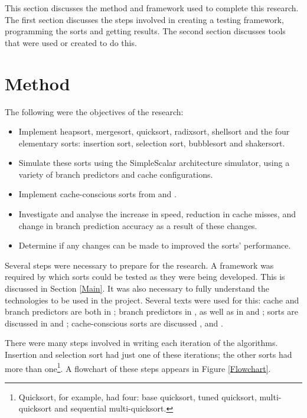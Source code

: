 \label{method}
This section discusses the method and framework used to complete this research.
The first section discusses the steps involved in creating a testing framework,
programming the sorts and getting results. The second section discusses tools
that were used or created to do this.

\section{Method}

The following were the objectives of the research:
\begin{itemize}
\item Implement heapsort, mergesort, quicksort, radixsort, shellsort and the four
elementary sorts: insertion sort, selection sort, bubblesort and shakersort.
\item Simulate these sorts using the SimpleScalar architecture simulator, using a
variety of branch predictors and cache configurations.
\item Implement cache-conscious sorts from \cite{LaMarca96} and
\cite{LaMarca99}.
\item Investigate and analyse the increase in speed, reduction in cache misses, 
and change in branch prediction accuracy as a result of these changes.
\item Determine if any changes can be made to improved the sorts' performance.
\end{itemize}

Several steps were necessary to prepare for the research.  A framework was
required by which sorts could be tested as they were being developed. This is
discussed in Section \ref{Main}. It was also necessary to fully understand the
technologies to be used in the project. Several texts were used for this: cache
and branch predictors are both in \cite{HennessyPatterson90}; branch predictors
in \cite{Uht97}, as well as in \cite{McFarling93} and \cite{Smith81}; sorts are
discussed in \cite{Sedgewick02} and \cite{Knuth98}; cache-conscious sorts are
discussed \cite{LaMarca96}, \cite{LaMarca99} and \cite{LaMarcaHeap96}.

There were many steps involved in writing each iteration of the algorithms.
Insertion and selection sort had just one of these iterations; the other
sorts had more than one\footnote{Quicksort, for example, had four: base
quicksort, tuned quicksort, multi-quicksort and sequential multi-quicksort.}. A
flowchart of these steps appears in Figure \vref{Flowchart}.

